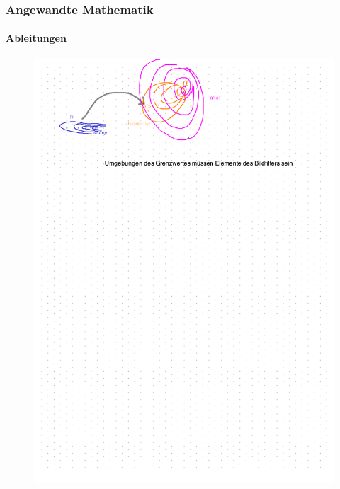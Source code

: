 \documentclass{beamer}
\begin{document}
\begin{frame}
  \frametitle{Angewandte Mathematik}
  \framesubtitle{Ableitungen}  

\begin{figure}[H]
    \centering
  \includegraphics[width=1.1\textwidth]{images/filter_conv.png}
\end{figure}

\end{frame}
\end{document}
